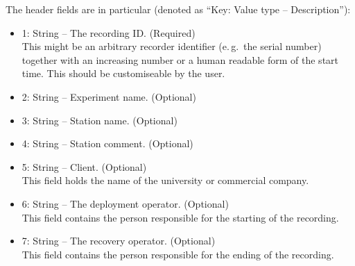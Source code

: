 \documentclass[DIV=10]{scrartcl}
\begin{document}
The header fields are in particular (denoted as “Key: Value type – Description”):
\begin{itemize}
  \item 1: String – The recording ID. (Required)\\
  This might be an arbitrary recorder identifier (e.\,g.\ the serial number) together with an increasing number or a human readable form of the start time.
  This should be customiseable by the user.
  \item 2: String – Experiment name. (Optional)
  \item 3: String – Station name. (Optional)
  \item 4: String – Station comment. (Optional)
  \item 5: String – Client. (Optional)\\
  This field holds the name of the university or commercial company.
  \item 6: String – The deployment operator. (Optional)\\
  This field contains the person responsible for the starting of the recording.
  \item 7: String – The recovery operator. (Optional)\\
  This field contains the person responsible for the ending of the recording.


\end{itemize}
\end{document}
